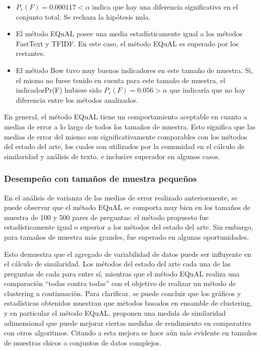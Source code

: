 \begin{itemize}
	\item \(P_r(F)= 0.000117 < \alpha\) indica que hay una diferencia significativa en el conjunto total. Se rechaza la hipótesis nula.
	\item El método EQuAL posee una media estadísticamente igual a los métodos FastText y TFIDF. En este caso, el método EQuAL es superado por los restantes.
	\item El método Bow tuvo muy buenos indicadores en este tamaño de muestra. Si, el mismo no fuese tenido en cuenta para este tamaño de muestra, el indicadorPr(F) hubiese sido \(P_r(F)= 0.056 > \alpha\) que indicaría que no hay diferencia entre los métodos analizados.
\end{itemize}

\bigskip En general, el método EQuAL tiene un comportamiento aceptable en cuanto a medias de error a lo largo de todos los tamaños de muestra. Esto significa que las medias de error del mismo son significativamente comparables con los métodos del estado del arte, los cuales son utilizados por la comunidad en el cálculo de similaridad y análisis de texto, e inclusive superador en algunos casos.

\subsubsection{Desempeño con tamaños de muestra pequeños}
En el análisis de varianza de las medias de error realizado anteriormente, se puede observar que el método EQuAL se comporta muy bien en los tamaños de muestra de 100 y 500 pares de preguntas: el método propuesto fue estadísticamente igual o superior a los métodos del estado del arte. Sin embargo, para tamaños de muestra más grandes, fue superado en algunas oportunidades.

\bigskip Esto demuestra que el agregado de variabilidad de datos puede ser influyente en el cálculo de similaridad. Los métodos del estado del arte cada una de las preguntas de cada para entre sí, mientras que el método EQuAL realiza una comparación “todas contra todas” con el objetivo de realizar un método de clustering a continuación. Para clarificar, se puede concluir que los gráficos y estadísticas obtenidos muestran que métodos basados en ensamble de clustering, y en particular el método EQuAL,  proponen una medida de similaridad adimensional que puede mejorar ciertas medidas de rendimiento en comparativa con otros algoritmos. Citando a \cite{fred2005combining} esta mejora se hace aún más evidente en tamaños de muestras chicos o conjuntos de datos complejos.


